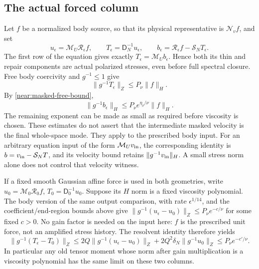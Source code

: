 \subsection{The actual forced column}

Let \(f\) be a normalized body source, so that its physical
representative is \(\mathcal N_v f\), and set
\[
 u_\epsilon=\mathcal M_U\mathcal R_\epsilon f,\qquad
 T_\epsilon=\mathsf D_N^{-1}u_\epsilon,
 \qquad b_\epsilon=\mathcal R_\epsilon f-\mathcal S_NT_\epsilon.
\]
The first row of the equation gives exactly
\(T_\epsilon=\mathcal M_U b_\epsilon\). Hence both its thin and
repair components are actual polarized stresses, even before full
spectral closure. Free body coercivity and \(g^{-1}\le1\) give
\[
 \|g^{-1}T_\epsilon\|_Z
 \le P_\nu\|f\|_H.
\]
By \eqref{near:masked-free-bound},
\[
 \|g^{-1}b_\epsilon\|_H
 \le P_\nu e^{\eta_\delta/\nu}\|f\|_H.
\]
The remaining exponent can be made as small as required before viscosity
is chosen. These estimates do not assert that the intermediate masked
velocity is the final whole-space mode.
They apply to the prescribed body input. For an arbitrary equation
input of the form \(\mathcal M_Uv_{\rm in}\), the corresponding
identity is \(b=v_{\rm in}-\mathcal S_NT\), and its velocity bound
retains \(\|g^{-1}v_{\rm in}\|_H\). A small stress norm alone does
not control that velocity witness.

If a fixed smooth Gaussian affine force is used in both geometries,
write \(u_0=\mathcal M_0\mathcal R_0f\),
\(T_0=\mathsf D_0^{-1}u_0\). Suppose its \(H\) norm is a fixed
viscosity polynomial. The body version of the same output comparison,
with rate \(\epsilon^{1/14}\), and the coefficient/end-region
bounds above give
\(\|g^{-1}(u_\epsilon-u_0)\|_Z\le P_\nu e^{-c/\nu}\)
for some fixed \(c>0\). No gain factor is needed on the input here:
\(f\) is the prescribed unit force, not an amplified stress history.
The resolvent identity therefore yields
\[
 \|g^{-1}(T_\epsilon-T_0)\|_Z
 \le2Q\|g^{-1}(u_\epsilon-u_0)\|_Z
       +2Q^2\delta_N\|g^{-1}u_0\|_Z
 \le P_\nu e^{-c'/\nu}.
\]
In particular any old tensor
moment whose norm after gain multiplication is a viscosity polynomial
has the same limit on these two columns.
